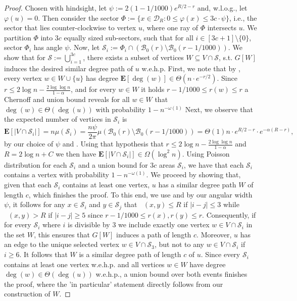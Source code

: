 \documentclass[letterpaper,11pt]{article}
\newcommand{\E}[1]{\mathbf{E}\left[#1\right]}
\newcommand{\wehp}{w.e.h.p.\xspace}
\newcommand{\B}{\mathcal B}
\newcommand{\disk}{\ensuremath{\mathcal D_R}\xspace}
\newcommand{\1}{\mathbb I}
\DeclareMathOperator{\dist}{d_h}
\begin{document}
%
\begin{proof}
Chosen with hindsight, let $\psi := 2(1 - 1/1000)e^{R/2-r}$ and, w.l.o.g., let $\varphi(u) = 0$. Then consider the sector $\Phi := \{x \in \disk : 0 \leq \varphi(x) \leq 3c \cdot\psi\}$, i.e., the sector that lies counter-clockwise to vertex $u$, where one ray of $\Phi$ intersects $u$. We partition $\Phi$ into $3c$ equally sized sub-sectors, such that for all $i \in [3c+1]\setminus\{0\}$, sector $\Phi_i$ has angle $\psi$. Now, let $\mathcal{S}_i := \Phi_i \cap (\B_0(r)\setminus\B_0(r-1/1000))$. We show that for $\mathcal{S}:= \bigcup_{i=1}^{3c}$, there exists a subset of vertices $W \subseteq V \cap \mathcal{S}$, s.t. $G[W]$ induces the desired similar degree path of $u$ \wehp 
%
First, we note that by , every vertex $w \in W\cup \{u\}$ has degree $\E{\deg(w)} \in \Theta(n\cdot e^{-r/2})$. Since $r \leq  2\log n - \frac{2\log\log n}{1-\alpha}$, and for every $w \in W$ it holds $r - 1/1000 \leq r(w) \leq r$ a Chernoff and union bound reveals for all $w \in W$ that $\deg(w) \in \Theta(\deg(u))$ with probability $1 - n^{-\omega(1)}$
%
Next, we observe that the expected number of vertices in $\mathcal{S}_i$ is 
%
$$
\E{|V \cap \mathcal{S}_i|} = n \mu(\mathcal{S}_i) = \frac{n\psi}{2\pi}\mu(\B_0(r)\setminus\B_0(r-1/1000)) = \Theta(1)n\cdot e^{R/2-r}\cdot e^{-\alpha(R-r)}, 
$$
%
by our choice of $\psi$ and . Using that hypothesis that $r \leq 2\log n - \frac{2\log\log n}{1-\alpha}$ and $R = 2\log n + C$ we then have $\E{|V \cap \mathcal{S}_i|} \in \Omega(\log^2 n)$. Using Poisson distribution for each $\mathcal{S}_i$ and a union bound for $3c$ areas $\mathcal{S}_i$, we have that each $\mathcal{S}_i$ contains a vertex with probability $1 - n^{-\omega(1)}$.
%
We proceed by showing that, given that each $\mathcal{S}_i$ contains at least one vertex, $u$ has a similar degree path $W$ of length $c$, which finishes the proof. To this end, we use \cite[Lemma 3.1]{gpp-rhg-12} and by our angular width $\psi$, it follows for any $x \in \mathcal{S}_{i}$ and $y \in \mathcal{S}_{j}$ that $\dist(x,y) \leq R$ if $|i - j| \leq 3$ while $\dist(x,y) > R$ if $|i - j| \geq 5$ since $r - 1/1000 \leq r(x), r(y) \leq r$. Consequently, if for every $\mathcal{S}_i$ where $i$ is divisible by $3$ we include exactly one vertex $w \in V \cap \mathcal{S}_i$ in the set $W$, this ensures that $G[W]$ induces a path of length $c$. Moreover,
$u$ has an edge to the unique selected vertex $w\in V\cap\mathcal S_3$, but not to any $w \in V \cap \mathcal{S}_i$ if $i\geq 6$. It follows that $W$ is a similar degree path of length $c$ of $u$. Since every $\mathcal{S}_i$ contains at least one vertex \wehp and all vertices $w \in W$ have degree $\deg(w) \in \Theta(\deg(u))$ \wehp, a union bound over both events finishes the proof, where the 'in particular' statement directly follows from our construction of $W$.
\end{proof}
\end{document}
